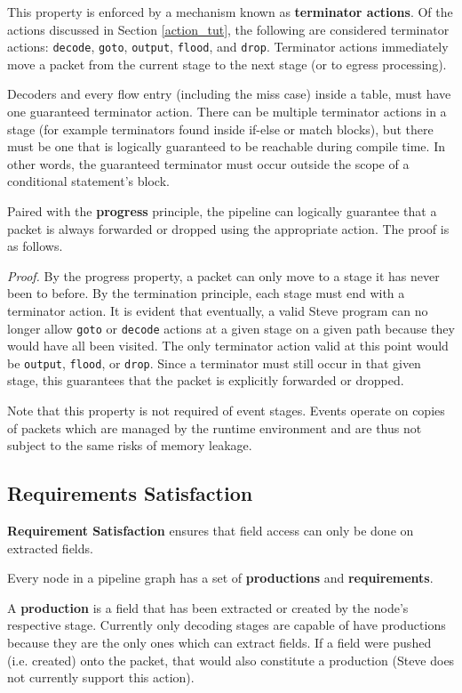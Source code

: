 This property is enforced by a mechanism known as \textbf{terminator actions}. Of the actions discussed in Section \ref{action_tut}, the following are considered terminator actions: \texttt{decode}, \texttt{goto}, \texttt{output}, \texttt{flood}, and \texttt{drop}. Terminator actions immediately move a packet from the current stage to the next stage (or to egress processing).

Decoders and every flow entry (including the miss case) inside a table, must have one guaranteed terminator action. There can be multiple terminator actions in a stage (for example terminators found inside if-else or match blocks), but there must be one that is logically guaranteed to be reachable during compile time. In other words, the guaranteed terminator must occur outside the scope of a conditional statement's block.

Paired with the \textbf{progress} principle, the pipeline can logically guarantee that a packet is always forwarded or dropped using the appropriate action. The proof is as follows.

\textit{Proof.} By the progress property, a packet can only move to a stage it has never been to before. By the termination principle, each stage must end with a terminator action. It is evident that eventually, a valid Steve program can no longer allow \texttt{goto} or \texttt{decode} actions at a given stage on a given path because they would have all been visited. The only terminator action valid at this point would be \texttt{output}, \texttt{flood}, or \texttt{drop}. Since a terminator must still occur in that given stage, this guarantees that the packet is explicitly forwarded or dropped.

Note that this property is not required of event stages. Events operate on copies of packets which are managed by the runtime environment and are thus not subject to the same risks of memory leakage.

\subsection{Requirements Satisfaction} \label{requirements_guide}

\textbf{Requirement Satisfaction} ensures that field access can only be done on extracted fields.

Every node in a pipeline graph has a set of \textbf{productions} and \textbf{requirements}.

A \textbf{production} is a field that has been extracted or created by the node's respective stage. Currently only decoding stages are capable of have productions because they are the only ones which can extract fields. If a field were pushed (i.e. created) onto the packet, that would also constitute a production (Steve does not currently support this action).

